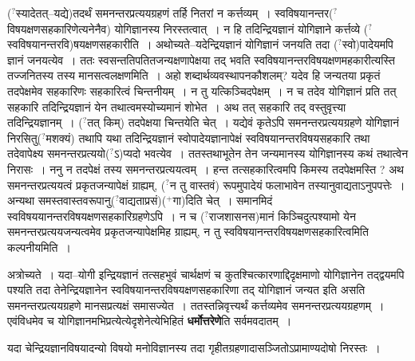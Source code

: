 \documentclass[article,12pt,a4paper]{memoir}
\newcommand{\unclear}[1]{($^{?}$#1)}
\newcommand{\add}[1]{($^{+}$#1)}
\begin{document}
	  \pstart \unclear{स्यादेतत्--यद्ये}तदर्थं समनन्तरप्रत्ययग्रहणं तर्हि नितरां न कर्त्तव्यम् । स्वविषयानन्तर\unclear{विषयक्षणसहकारिणेत्यनेनैव} योगिज्ञानस्य निरस्तत्वात् । न हि तदिन्द्रियज्ञानं योगिज्ञाने कर्त्तव्ये \unclear{स्वविषयानन्तरवि}षयक्षणसहकारीति । अथोच्यते--यदेन्द्रियज्ञानं योगिज्ञानं जनयति तदा \unclear{स्वो}पादेयमपि ज्ञानं जनयत्येव । ततः स्वसन्ततिपतितजन्यक्षणापेक्षया तद् भवति स्वविषयानन्तरविषयक्षणमहकारीत्यस्ति तज्जनितस्य तस्य मानसत्वलक्षणमिति । अहो शब्दार्थव्यवस्थापनकौशलम्? यदेव हि जन्यतया प्रकृतं तदपेक्षमेव सहकारिणः सहकारित्वं चिन्तनीयम् । न तु यत्किञ्चिदपेक्षम् । न च तदेव योगिज्ञानं प्रति तत् सहकारि तदिन्द्रियज्ञानं येन तथात्वमस्योच्यमानं शोभेत । अथ तत् सहकारि तद् वस्तुवृत्त्या तदिन्द्रियज्ञानम् । \unclear{तत् किम्} तदपेक्षया चिन्तयेति चेत् । यद्येवं कृतेऽपि समनन्तरप्रत्ययग्रहणे योगिज्ञानं निरसितु\unclear{मशक्यं} तथापि यथा तदिन्द्रियज्ञानं स्वोपादेयज्ञानापेक्षं स्वविषयानन्तरविषयसहकारि तथा तदेवापेक्ष्य समनन्तरप्रत्ययो\unclear{ऽ}प्यदो भ\leavevmode{}वत्येव । ततस्तथाभूतेन तेन जन्यमानस्य योगिज्ञानस्य कथं तथात्वेन निरासः । ननु न तदपेक्षं तस्य समनन्तरप्रत्ययत्वम् । हन्त तत्सहकारित्वमपि किमस्य तदपेक्षमस्ति ? अथ समनन्तरप्रत्ययत्वं प्रकृतजन्यापेक्षं ग्राह्यम्, \unclear{न तु वास्तवं} रूपमुपादेयं फलाभावेन तस्यानुवाद्यताऽनुपपत्तेः । अन्यथा समस्तवास्तवरूपानु\unclear{वाद्यताप्रसं}\add{गा}दिति चेत् । समानमिदं स्वविषययानन्तरविषयक्षणसहकारिग्रहणेऽपि । न च \unclear{राजशासनस}मानं किञ्चिदुत्पश्यामो येन समनन्तरप्रत्ययजन्यत्वमेव प्रकृतजन्यापेक्षमिह ग्राह्यम्, न तु स्वविषयानन्तरविषयक्षणसहकारित्वमिति कल्पनीयमिति ।
	\pend
      

	  \pstart अत्रोच्यते । यदा--योगी इन्द्रियज्ञानं तत्सहभुवं चार्थक्षणं च कुतश्चित्कारणाद्दिदृक्षमाणो योगिज्ञानेन तद्द्वयमपि पश्यति तदा तेनेन्द्रियज्ञानेन स्वविषयानन्तरविषयक्षणसहकारिणा तद् योगिज्ञानं जन्यत इति असति समनन्तरप्रत्ययग्रहणे मानसप्रत्यक्षं समासज्येत । ततस्तन्निवृत्त्यर्थं कर्त्तव्यमेव समनन्तरप्रत्ययग्रहणम् । एवंविधमेव च योगिज्ञानमभिप्रत्येत्येदृशेनेत्येभिहितं \textbf{धर्मोत्तरेणे}ति सर्वमवदातम् ।
	\pend
	  \bigskip
	  \begingroup
	

	  \pstart {}यदा चेन्द्रियज्ञानविषयादन्यो विषयो मनोविज्ञानस्य तदा गृहीतग्रहणादासञ्जितोऽप्रामाण्यदोषो निरस्तः ।
	\pend
        
\end{document}
